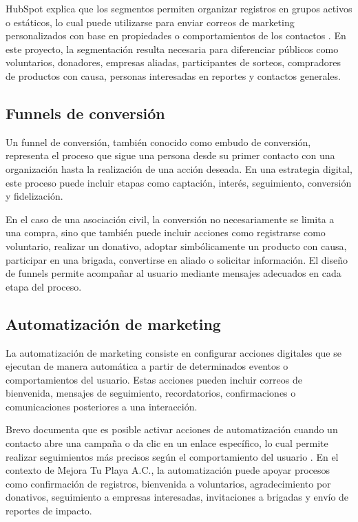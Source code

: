 HubSpot explica que los segmentos permiten organizar registros en grupos activos o estáticos, lo cual puede utilizarse para enviar correos de marketing personalizados con base en propiedades o comportamientos de los contactos \cite{hubspot_segments}. En este proyecto, la segmentación resulta necesaria para diferenciar públicos como voluntarios, donadores, empresas aliadas, participantes de sorteos, compradores de productos con causa, personas interesadas en reportes y contactos generales.

\subsection{Funnels de conversión}

Un funnel de conversión, también conocido como embudo de conversión, representa el proceso que sigue una persona desde su primer contacto con una organización hasta la realización de una acción deseada. En una estrategia digital, este proceso puede incluir etapas como captación, interés, seguimiento, conversión y fidelización.

En el caso de una asociación civil, la conversión no necesariamente se limita a una compra, sino que también puede incluir acciones como registrarse como voluntario, realizar un donativo, adoptar simbólicamente un producto con causa, participar en una brigada, convertirse en aliado o solicitar información. El diseño de funnels permite acompañar al usuario mediante mensajes adecuados en cada etapa del proceso.

\subsection{Automatización de marketing}

La automatización de marketing consiste en configurar acciones digitales que se ejecutan de manera automática a partir de determinados eventos o comportamientos del usuario. Estas acciones pueden incluir correos de bienvenida, mensajes de seguimiento, recordatorios, confirmaciones o comunicaciones posteriores a una interacción.

Brevo documenta que es posible activar acciones de automatización cuando un contacto abre una campaña o da clic en un enlace específico, lo cual permite realizar seguimientos más precisos según el comportamiento del usuario \cite{brevo_automation_clicks}. En el contexto de Mejora Tu Playa A.C., la automatización puede apoyar procesos como confirmación de registros, bienvenida a voluntarios, agradecimiento por donativos, seguimiento a empresas interesadas, invitaciones a brigadas y envío de reportes de impacto.

